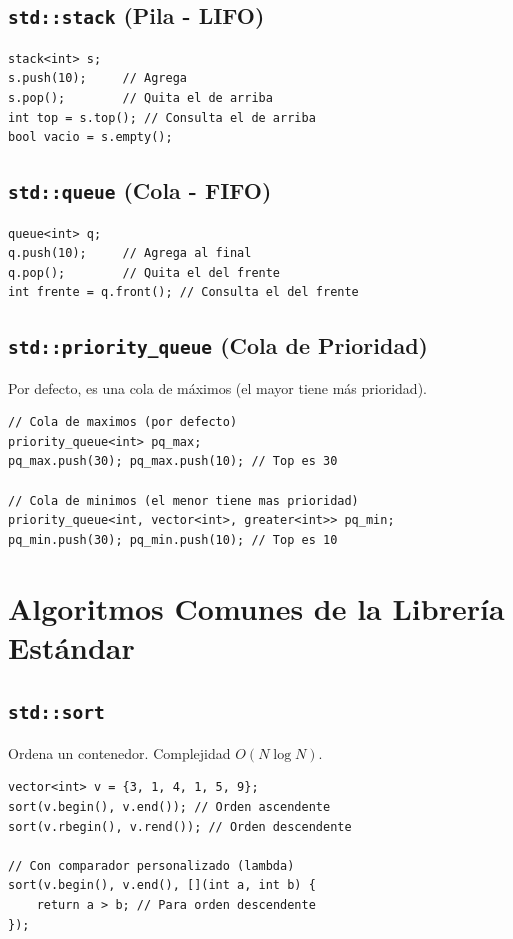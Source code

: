 \documentclass[11pt, a4paper]{article}
\begin{document}
\subsection{\texttt{std::stack} (Pila - LIFO)}
\begin{lstlisting}
stack<int> s;
s.push(10);     // Agrega
s.pop();        // Quita el de arriba
int top = s.top(); // Consulta el de arriba
bool vacio = s.empty();
\end{lstlisting}

\subsection{\texttt{std::queue} (Cola - FIFO)}
\begin{lstlisting}
queue<int> q;
q.push(10);     // Agrega al final
q.pop();        // Quita el del frente
int frente = q.front(); // Consulta el del frente
\end{lstlisting}

\subsection{\texttt{std::priority\_queue} (Cola de Prioridad)}
Por defecto, es una cola de máximos (el mayor tiene más prioridad).
\begin{lstlisting}
// Cola de maximos (por defecto)
priority_queue<int> pq_max;
pq_max.push(30); pq_max.push(10); // Top es 30

// Cola de minimos (el menor tiene mas prioridad)
priority_queue<int, vector<int>, greater<int>> pq_min;
pq_min.push(30); pq_min.push(10); // Top es 10
\end{lstlisting}


\section{Algoritmos Comunes de la Librería Estándar}

\subsection{\texttt{std::sort}}
Ordena un contenedor. Complejidad $O(N \log N)$.
\begin{lstlisting}
vector<int> v = {3, 1, 4, 1, 5, 9};
sort(v.begin(), v.end()); // Orden ascendente
sort(v.rbegin(), v.rend()); // Orden descendente

// Con comparador personalizado (lambda)
sort(v.begin(), v.end(), [](int a, int b) {
    return a > b; // Para orden descendente
});
\end{lstlisting}
\end{document}

